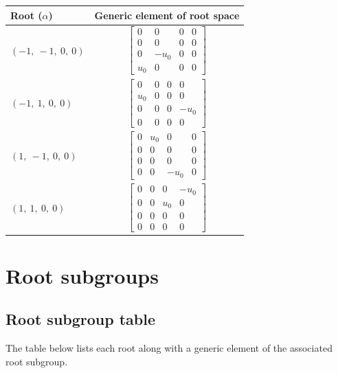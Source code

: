 \documentclass[11pt]{article}
\newcommand{\noi}{\noindent}
\theoremstyle{definition}
\begin{document}
\noindent \begin{tabular}{|l|c|}
    \hline
    \textbf{Root ($\alpha$)} & \textbf{Generic element of root space} \\
    \hline
    $\left( -1, \  -1, \  0, \  0\right)$ & $\left[\begin{matrix}0 & 0 & 0 & 0\\0 & 0 & 0 & 0\\0 & - u_{0} & 0 & 0\\u_{0} & 0 & 0 & 0\end{matrix}\right]$ \\
    \hline
    $\left( -1, \  1, \  0, \  0\right)$ & $\left[\begin{matrix}0 & 0 & 0 & 0\\u_{0} & 0 & 0 & 0\\0 & 0 & 0 & - u_{0}\\0 & 0 & 0 & 0\end{matrix}\right]$ \\
    \hline
    $\left( 1, \  -1, \  0, \  0\right)$ & $\left[\begin{matrix}0 & u_{0} & 0 & 0\\0 & 0 & 0 & 0\\0 & 0 & 0 & 0\\0 & 0 & - u_{0} & 0\end{matrix}\right]$ \\
    \hline
    $\left( 1, \  1, \  0, \  0\right)$ & $\left[\begin{matrix}0 & 0 & 0 & - u_{0}\\0 & 0 & u_{0} & 0\\0 & 0 & 0 & 0\\0 & 0 & 0 & 0\end{matrix}\right]$ \\
    \hline
\end{tabular}


\newpage
\section{Root subgroups}

\subsection{Root subgroup table}

\noi The table below lists each root along with a generic element of the associated root subgroup.

\bigskip
\end{document}
